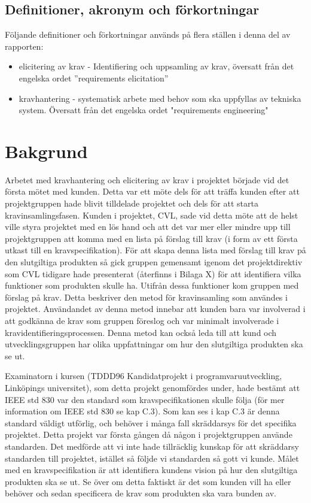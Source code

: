 \subsection{Definitioner, akronym och förkortningar}
Följande definitioner och förkortningar används på flera ställen i denna del av rapporten:
\begin{itemize}
	\item elicitering av krav - Identifiering och uppsamling av krav, översatt från det engelska ordet ”requirements elicitation”
	\item kravhantering - systematisk arbete med behov som ska uppfyllas av tekniska system. Översatt från det engelska ordet "requirements engineering"
\end{itemize}
\section{Bakgrund}
\label{sec:background-jannering}

Arbetet med kravhantering och elicitering av krav i projektet började vid det första mötet med kunden. Detta var ett möte dels för att träffa kunden efter att projektgruppen hade blivit tilldelade projektet och dels för att starta kravinsamlingsfasen. Kunden i projektet, CVL, sade vid detta möte att de helst ville styra projektet med en lös hand och att det var mer eller mindre upp till projektgruppen att komma med en lista på förslag till krav (i form av ett första utkast till en kravspecifikation). För att skapa denna lista med förslag till krav på den slutgiltiga produkten så gick gruppen gemensamt igenom det projektdirektiv som CVL tidigare hade presenterat (återfinns i Bilaga X) för att identifiera vilka funktioner som produkten skulle ha. Utifrån dessa funktioner kom gruppen med förslag på krav. Detta beskriver den metod för kravinsamling som användes i projektet. Användandet av denna metod innebar att kunden bara var involverad i att godkänna de krav som gruppen föreslog och var minimalt involverade i kravidentifieringsprocessen. Denna metod kan också leda till att kund och utvecklingsgruppen har olika uppfattningar om hur den slutgiltiga produkten ska se ut. 

Examinatorn i kursen (TDDD96 Kandidatprojekt i programvaruutveckling, Linköpings universitet), som detta projekt genomfördes under, hade bestämt att IEEE std 830 var den standard som kravspecifikationen skulle följa (för mer information om IEEE std 830 se kap C.3). Som kan ses i kap C.3 är denna standard väldigt utförlig, och behöver i många fall skräddarsys för det specifika projektet. Detta projekt var första gången då någon i projektgruppen använde standarden. Det medförde att vi inte hade tillräcklig kunskap för att skräddarsy standarden till projektet, istället så följde vi standarden så gott vi kunde. Målet med en kravspecifikation är att identifiera kundens vision på hur den slutgiltiga produkten ska se ut. Se över om detta faktiskt är det som kunden vill ha eller behöver och sedan specificera de krav som produkten ska vara bunden av. 


